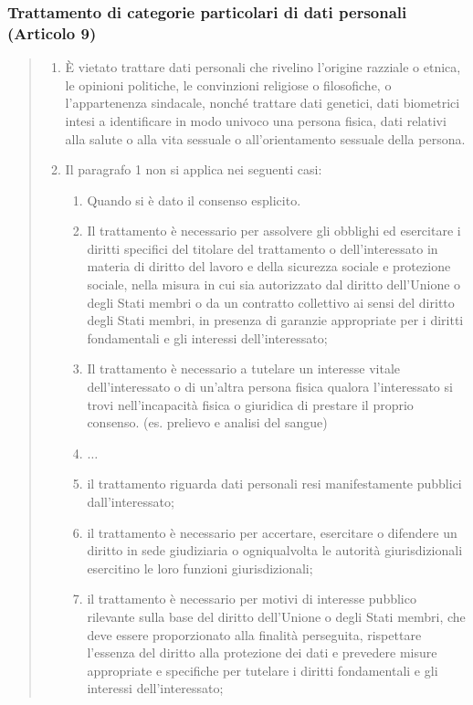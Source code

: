\subsubsection*{Trattamento di categorie particolari di dati personali (Articolo 9)}
\begin{quote}
    \begin{enumerate}
        \item È vietato trattare dati personali che rivelino l'origine razziale o etnica, le opinioni politiche, le convinzioni religiose o filosofiche, o l'appartenenza sindacale, nonché trattare dati genetici, dati biometrici intesi a identificare in modo univoco una persona fisica, dati relativi alla salute o alla vita sessuale o all'orientamento sessuale della persona.
        \item Il paragrafo 1 non si applica nei seguenti casi:
            \begin{enumerate}[label=\alph*)]
                \item Quando si è dato il consenso esplicito.
                \item Il trattamento è necessario per assolvere gli obblighi ed esercitare i diritti specifici del titolare del trattamento o dell'interessato in materia di diritto del lavoro e della sicurezza sociale e protezione sociale, nella misura in cui sia autorizzato dal diritto dell'Unione o degli Stati membri o da un contratto collettivo ai sensi del diritto degli Stati membri, in presenza di garanzie appropriate per i diritti fondamentali e gli interessi dell'interessato;
                \item Il trattamento è necessario a tutelare un interesse vitale dell'interessato o di un'altra persona fisica qualora l'interessato si trovi nell'incapacità fisica o giuridica di prestare il proprio consenso. (es. prelievo e analisi del sangue)
                \item $\dots$
                \item il trattamento riguarda dati personali resi manifestamente pubblici dall'interessato;
                \item il trattamento è necessario per accertare, esercitare o difendere un diritto in sede giudiziaria o ogniqualvolta le autorità giurisdizionali esercitino le loro funzioni giurisdizionali;
                \item il trattamento è necessario per motivi di interesse pubblico rilevante sulla base del diritto dell'Unione o degli Stati membri, che deve essere proporzionato alla finalità perseguita, rispettare l'essenza del diritto alla protezione dei dati e prevedere misure appropriate e specifiche per tutelare i diritti fondamentali e gli interessi dell'interessato;

\end{enumerate}
\end{enumerate}
\end{quote}
